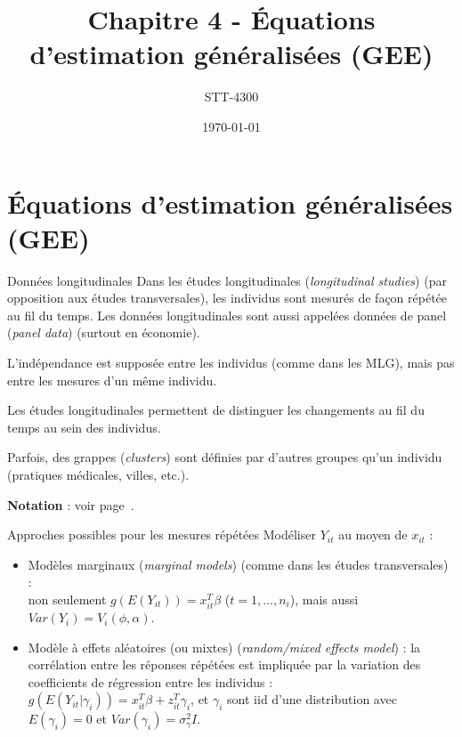 \documentclass{BeamerTemplate}
\title{Chapitre 4 - Équations d'estimation généralisées (GEE)}
\subtitle{STT-4300}
\date{\today}
\begin{document}
\begin{refsection}

\begin{frame}[t]
\titlepage
\end{frame}

\section{Équations d'estimation généralisées (GEE)}
\label{GEE.section}

\begin{frame}{Données longitudinales}
Dans les {\color{blue}études longitudinales} (\textit{longitudinal studies}) (par opposition
aux études transversales), les individus sont mesurés de façon répétée au fil du
temps. Les données longitudinales sont aussi appelées {\color{blue}données de panel} (\textit{panel data}) (surtout en
économie).

\bigskip
L'indépendance est supposée entre les individus (comme dans les MLG), mais pas entre
les mesures d'un même individu.

\bigskip
Les études longitudinales permettent de distinguer les changements au fil du temps
au sein des individus.

\bigskip
Parfois, des {\color{blue}grappes} (\textit{clusters}) sont définies par d'autres groupes qu'un
individu (pratiques médicales, villes, etc.).

\bigskip
\textbf{Notation} : voir page~\pageref{Ximatrix}.
\end{frame}

\begin{frame}{Approches possibles pour les mesures répétées}
Modéliser $Y_{it}$ au moyen de $x_{it}$ :
\begin{itemize}
\item {\color{blue}Modèles marginaux} (\textit{marginal models}) (comme dans les études transversales) :\\
non seulement $g(E(Y_{it})) = x_{it}^T \beta$ ($t=1,\ldots,n_i$), mais aussi $Var(Y_i) = V_i(\phi,\alpha)$.
\item {\color{blue}Modèle à effets aléatoires (ou mixtes)} (\textit{random/mixed effects model}) : la corrélation entre
  les réponses répétées est
  impliquée par la variation des coefficients de régression entre les individus :\\
$g(E(Y_{it}|\gamma_i)) = x_{it}^T \beta + z_{it}^T \gamma_i$, et $\gamma_i$ sont iid
d'une distribution avec $E(\gamma_i)=0$ et $Var(\gamma_i)= \sigma^2_{\gamma}I$.


\end{itemize}
\end{frame}
\end{refsection}
\end{document}
